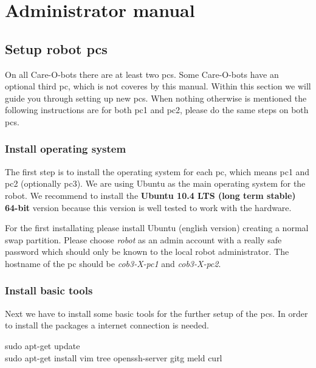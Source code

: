 \chapter{Administrator manual}
\label{chap:admin}

\section{Setup robot pcs}
On all Care-O-bots there are at least two pcs. Some Care-O-bots have an optional third pc, which is not coveres by this manual. Within this section we will guide you through setting up new pcs. When nothing otherwise is mentioned the following instructions are for both pc1 and pc2, please do the same steps on both pcs.

\subsection{Install operating system}
The first step is to install the operating system for each pc, which means pc1 and pc2 (optionally pc3). We are using Ubuntu as the main operating system for the robot. We recommend to install the \textbf{Ubuntu 10.4 LTS (long term stable) 64-bit} version because this version is well tested to work with the hardware. 

For the first installating please install Ubuntu (english version) creating a normal swap partition. Please choose \textit{robot} as an admin account with a really safe password which should only be known to the local robot administrator. The hostname of the pc should be \textit{cob3-X-pc1} and \textit{cob3-X-pc2}.

\subsection{Install basic tools}
Next we have to install some basic tools for the further setup of the pcs. In order to install the packages a internet connection is needed.

\colorbox{light-gray}{
\begin{minipage}{1.0\textwidth}
	sudo apt-get update \\ 
	sudo apt-get install vim tree openssh-server gitg meld curl
\end{minipage} } \\

